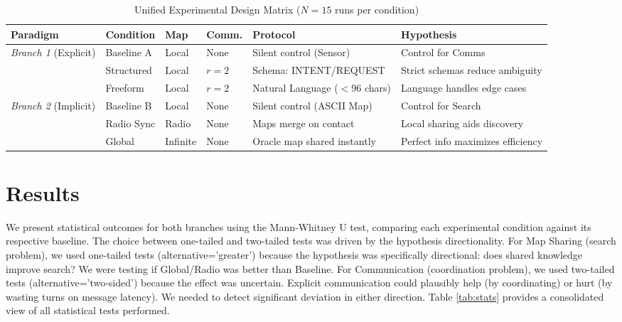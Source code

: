 \documentclass[10pt,twocolumn]{article}
\begin{document}
\begin{table}[t]
\centering
\small
\caption{Unified Experimental Design Matrix ($N=15$ runs per condition)}
\label{tab:design}
\begin{tabular}{llllll}
\toprule
\textbf{Paradigm} & \textbf{Condition} & \textbf{Map} & \textbf{Comm.} & \textbf{Protocol} & \textbf{Hypothesis} \\
\midrule
\textit{Branch 1} (Explicit) & Baseline A & Local & None & Silent control (Sensor) & Control for Comms \\
& Structured & Local & $r=2$ & Schema: INTENT/REQUEST & Strict schemas reduce ambiguity \\
& Freeform & Local & $r=2$ & Natural Language ($<$96 chars) & Language handles edge cases \\
\midrule
\textit{Branch 2} (Implicit) & Baseline B & Local & None & Silent control (ASCII Map) & Control for Search \\
& Radio Sync & Radio & None & Maps merge on contact & Local sharing aids discovery \\
& Global & Infinite & None & Oracle map shared instantly & Perfect info maximizes efficiency \\
\bottomrule
\end{tabular}
\end{table}

\section{Results}

We present statistical outcomes for both branches using the Mann-Whitney U test, comparing each experimental condition against its respective baseline. The choice between one-tailed and two-tailed tests was driven by the hypothesis directionality. For Map Sharing (search problem), we used one-tailed tests (alternative='greater') because the hypothesis was specifically directional: does shared knowledge improve search? We were testing if Global/Radio was better than Baseline. For Communication (coordination problem), we used two-tailed tests (alternative='two-sided') because the effect was uncertain. Explicit communication could plausibly help (by coordinating) or hurt (by wasting turns on message latency). We needed to detect significant deviation in either direction. Table \ref{tab:stats} provides a consolidated view of all statistical tests performed.
\end{document}
